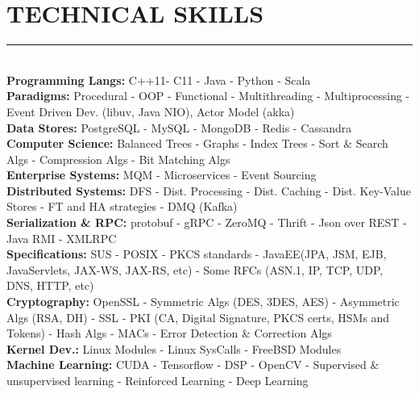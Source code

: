 \documentclass[10pt,a4paper]{article}
\begin{document}
\section{TECHNICAL SKILLS}
\noindent \rule {18.0cm}{0.2pt} \\
\noindent
\textbullet \hspace{0.1cm}\textbf{Programming Langs:} C++11- C11 - Java - Python - Scala \\
\textbullet \hspace{0.1cm}\textbf{Paradigms:} Procedural - OOP - Functional - Multithreading - Multiprocessing - Event Driven Dev. (libuv, Java NIO), Actor Model (akka) \\
\textbullet \hspace{0.1cm}\textbf{Data Stores:} PostgreSQL - MySQL - MongoDB - Redis - Cassandra \\
\textbullet \hspace{0.1cm}\textbf{Computer Science:} Balanced Trees - Graphs - Index Trees - Sort \& Search Algs - Compression Algs - Bit Matching Algs  \\
\textbullet \hspace{0.1cm}\textbf{Enterprise Systems:} MQM - Microservices - Event Sourcing \\
\textbullet \hspace{0.1cm}\textbf{Distributed Systems:} DFS - Dist. Processing - Dist. Caching - Dist. Key-Value Stores - FT and HA strategies - DMQ (Kafka) \\
\textbullet \hspace{0.1cm}\textbf{Serialization \& RPC:} protobuf - gRPC - ZeroMQ - Thrift - Json over REST - Java RMI - XMLRPC \\
\textbullet \hspace{0.1cm}\textbf{Specifications:} SUS - POSIX - PKCS standards - JavaEE(JPA, JSM, EJB, JavaServlets, JAX-WS, JAX-RS, etc) - Some RFCs (ASN.1, IP, TCP, UDP, DNS, HTTP, etc) \\
\textbullet \hspace{0.1cm}\textbf{Cryptography:} OpenSSL - Symmetric Algs (DES, 3DES, AES) - Asymmetric Algs (RSA, DH) - SSL - PKI (CA, Digital Signature, PKCS certs, HSMs and Tokens) - Hash Algs - MACs - Error Detection \& Correction Algs \\ 
\textbullet \hspace{0.1cm}\textbf{Kernel Dev.:} Linux Modules - Linux SysCalls - FreeBSD Modules \\
\textbullet \hspace{0.1cm}\textbf{Machine Learning:} CUDA - Tensorflow - DSP - OpenCV - Supervised \& unsupervised learning - Reinforced Learning - Deep Learning \\
\end{document}
